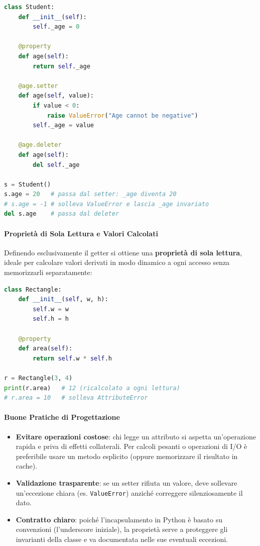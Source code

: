 \documentclass[12pt]{extarticle}
\begin{document}
\begin{lstlisting}[language=Python]
class Student:
    def __init__(self):
        self._age = 0

    @property
    def age(self):
        return self._age

    @age.setter
    def age(self, value):
        if value < 0:
            raise ValueError("Age cannot be negative")
        self._age = value

    @age.deleter
    def age(self):
        del self._age

s = Student()
s.age = 20   # passa dal setter: _age diventa 20
# s.age = -1 # solleva ValueError e lascia _age invariato
del s.age    # passa dal deleter
\end{lstlisting}

\paragraph{Proprietà di Sola Lettura e Valori Calcolati}

Definendo esclusivamente il getter si ottiene una \textbf{proprietà di sola lettura}, ideale per calcolare valori derivati in modo dinamico a ogni accesso senza memorizzarli separatamente:

\begin{lstlisting}[language=Python]
class Rectangle:
    def __init__(self, w, h):
        self.w = w
        self.h = h

    @property
    def area(self):
        return self.w * self.h

r = Rectangle(3, 4)
print(r.area)   # 12 (ricalcolato a ogni lettura)
# r.area = 10   # solleva AttributeError
\end{lstlisting}

\paragraph{Buone Pratiche di Progettazione}

\begin{itemize}
    \item \textbf{Evitare operazioni costose}: chi legge un attributo si aspetta un'operazione rapida e priva di effetti collaterali. Per calcoli pesanti o operazioni di I/O è preferibile usare un metodo esplicito (oppure memorizzare il risultato in cache).
    \item \textbf{Validazione trasparente}: se un setter rifiuta un valore, deve sollevare un'eccezione chiara (es. \texttt{ValueError}) anziché correggere silenziosamente il dato.
    \item \textbf{Contratto chiaro}: poiché l'incapsulamento in Python è basato su convenzioni (l'underscore iniziale), la proprietà serve a proteggere gli invarianti della classe e va documentata nelle sue eventuali eccezioni.
\end{itemize}
\end{document}
